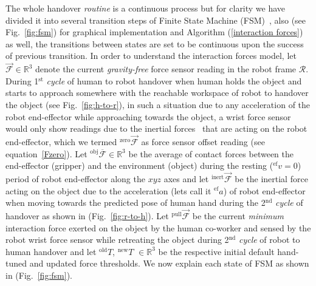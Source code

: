 The whole handover \textit{routine} is a continuous process but for clarity we have divided it into several transition steps of Finite State Machine (FSM)~\cite{johnson1968automatic}, also (see Fig.~\ref{fig:fsm}) for graphical implementation and Algorithm (\ref{interaction forces}) as well, the transitions between states are set to be continuous upon the success of previous transition. In order to understand the interaction forces model, let $\mathcal{\vec{F}}\in \mathbb{R}^3$ denote the current \textit{gravity-free} force sensor reading in the robot frame $\mathcal{R}$. During 1$^\text{st}$ \textit{cycle} of human to robot handover when human holds the object and starts to approach somewhere with the reachable workspace of robot to handover the object (see Fig.~\ref{fig:h-to-r}), in such a situation due to any acceleration of the robot end-effector while approaching towards the object, a wrist force sensor would only show readings due to the inertial forces~\cite{spong2008robot} that are acting on the robot end-effector, which we termed ${}^\text{zero}\vec{\mathcal{F}}$ as force sensor offset reading (see equation~\ref{Fzero}). Let ${}^\text{obj}\overline{\mathcal{F}}\in \mathbb{R}^3$ be the average of contact forces between the end-effector (gripper) and the environment (object) during the resting (${}^{\text{ef}}v=0$) period of robot end-effector along the $xyz$ axes and let ${}^\text{inert}\vec{\mathcal{F}}$ be the inertial force acting on the object due to the acceleration (lets call it ${}^{\text{ef}}a$) of robot end-effector when moving towards the predicted pose of human hand during the 2$^\text{nd}$ \textit{cycle} of handover as shown in (Fig.~\ref{fig:r-to-h}). Let ${}^\text{pull}\vec{\mathcal{F}}$ be the current \textit{minimum} interaction force exerted on the object by the human co-worker and sensed by the robot wrist force sensor while retreating the object during 2$^\text{nd}$ \textit{cycle} of robot to human handover and let ${}^\text{old}T$, ${}^\text{new}T$ $\in \mathbb{R}^3$ be the respective initial default hand-tuned and updated force thresholds. We now explain each state of FSM as shown in (Fig.~\ref{fig:fsm}).



